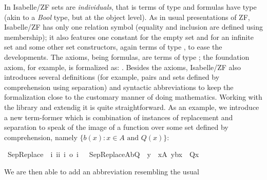 In Isabelle/ZF sets are \emph{individuals}, that is terms of type
 and formulas have type  
(akin to a \emph{Bool} type, but at the object level). 
As in usual presentations
of ZF, Isabelle/ZF has only one relation symbol
\isatt{\ensuremath{\in}} (equality and inclusion are defined
using membership); it also features one constant 
for the empty set and  for an infinite set and some other
set constructors, again terms of type , to ease the
developments. The axioms, being formulas, are terms of type ;
the foundation axiom, for example, is formalized as:
. Besides the axioms, Isabelle/ZF also
introduces several definitions (for example, pairs and sets defined by
comprehension using separation) and syntactic abbreviations to keep
the formalization close to the customary manner of doing mathematics.
Working with the library and extendig it is quite
straightforward. 
As an example, we introduce  a new term-former which is combination of
instances of replacement and separation to speak of the image of a function over some set
defined by comprehension, namely $\{b(x): x\in A\text{ and }Q(x)\}$:
\begin{isabelle}
  \isamarkupfalse%
  \ SepReplace\ {\isacharcolon}{\isacharcolon}\
  {\isachardoublequoteopen}{\isacharbrackleft}i{\isacharcomma}\
  i{\isasymRightarrow}i{\isacharcomma}\ i{\isasymRightarrow}\
  o{\isacharbrackright}\
  {\isasymRightarrow}i{\isachardoublequoteclose}\
  \isanewline \ \
  {\isachardoublequoteopen}SepReplace{\isacharparenleft}A{\isacharcomma}b{\isacharcomma}Q{\isacharparenright}\
  {\isacharequal}{\isacharequal}\ {\isacharbraceleft}y\ {\isachardot}\
  x{\isasymin}A{\isacharcomma}\
  y{\isacharequal}b{\isacharparenleft}x{\isacharparenright}\
  {\isasymand}\
  Q{\isacharparenleft}x{\isacharparenright}{\isacharbraceright}{\isachardoublequoteclose}
\end{isabelle}
\noindent %
We are then able to add an abbreviation resembling the usual
